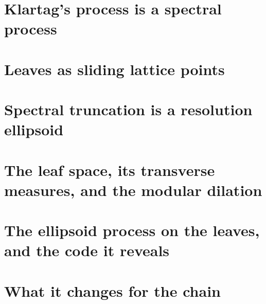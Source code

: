 \documentclass[11pt]{article}
\theoremstyle{plain}
\theoremstyle{definition}\newtheorem{definition}[theorem]{Definition}\newtheorem{remark}[theorem]{Remark}
\begin{document}
\section{Klartag's process is a spectral process}

\section{Leaves as sliding lattice points}

\section{Spectral truncation is a resolution ellipsoid}

\section{The leaf space, its transverse measures, and the modular dilation}

\section{The ellipsoid process on the leaves, and the code it reveals}

\section{What it changes for the chain}

\end{document}
